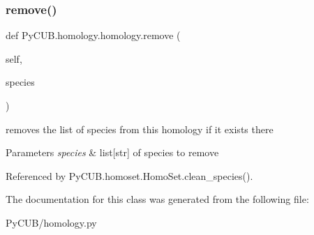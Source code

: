 \subsubsection{\texorpdfstring{remove()}{remove()}}
{\footnotesize\ttfamily def Py\+C\+U\+B.\+homology.\+homology.\+remove (\begin{DoxyParamCaption}\item[{}]{self,  }\item[{}]{species }\end{DoxyParamCaption})}



removes the list of species from this homology if it exists there 


\begin{DoxyParams}{Parameters}
{\em species} & list\mbox{[}str\mbox{]} of species to remove \\
\hline
\end{DoxyParams}


Referenced by Py\+C\+U\+B.\+homoset.\+Homo\+Set.\+clean\+\_\+species().



The documentation for this class was generated from the following file\+:\begin{DoxyCompactItemize}
\item 
Py\+C\+U\+B/homology.\+py\end{DoxyCompactItemize}
